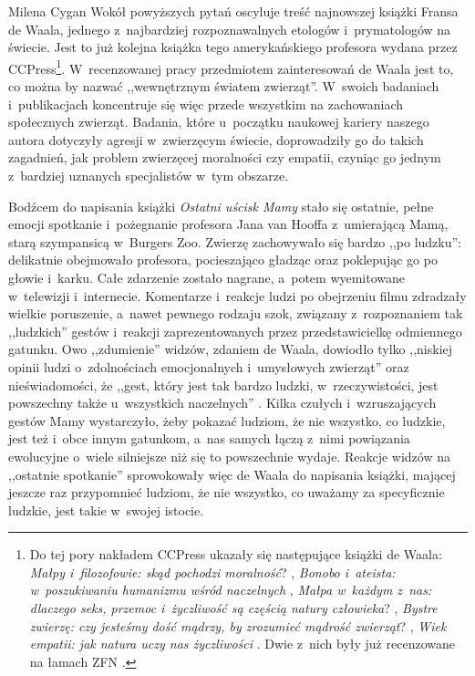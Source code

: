 \begin{newrevplenv}{Milena Cygan}
Wokół powyższych pytań oscyluje treść najnowszej książki Fransa de Waala, jednego z~najbardziej rozpoznawalnych etologów i~prymatologów na świecie. Jest to już kolejna książka tego amerykańskiego profesora wydana przez CCPress\footnote{Do tej pory nakładem CCPress ukazały się następujące książki de Waala: \textit{Małpy i~filozofowie: skąd pochodzi moralność}?
\parencite*[][]{waal_malpy_2013}, %
 \textit{Bonobo i~ateista: w~poszukiwaniu humanizmu wśród naczelnych} 
\parencite*[][]{waal_bonobo_2014}, %
 \textit{Małpa w~każdym z~nas: dlaczego seks, przemoc i~życzliwość są częścią natury człowieka}? 
\parencite*[][]{waal_malpa_2015}, %
 \textit{Bystre zwierzę: czy jesteśmy dość mądrzy, by zrozumieć mądrość zwierząt}? 
\parencite*[][]{waal_bystre_2016}, %
 \textit{Wiek empatii: jak natura uczy nas życzliwości} 
\parencite*[][]{waal_wiek_2019}. %
 Dwie z~nich były już recenzowane na łamach ZFN 
\parencites[][]{sarosiek_odmiennosc_2018}[][]{cygan_empatia_2019}.%
}. W~recenzowanej pracy przedmiotem zainteresowań de Waala jest to, co można by nazwać ,,wewnętrznym światem zwierząt''. W~swoich badaniach i~publikacjach koncentruje się więc przede wszystkim na zachowaniach społecznych zwierząt. Badania, które u~początku naukowej kariery naszego autora dotyczyły agresji w~zwierzęcym świecie, doprowadziły go do takich zagadnień, jak problem zwierzęcej moralności czy empatii, czyniąc go jednym z~bardziej uznanych specjalistów w~tym obszarze.


Bodźcem do napisania książki \textit{Ostatni uścisk Mamy} stało się ostatnie, pełne emocji spotkanie i~pożegnanie profesora Jana van Hooffa z~umierającą Mamą, starą szympansicą w~Burgers Zoo. Zwierzę zachowywało się bardzo ,,po ludzku'': delikatnie obejmowało profesora, pocieszająco gładząc oraz poklepując go po głowie i~karku. Całe zdarzenie zostało nagrane, a~potem wyemitowane w~telewizji i~internecie. Komentarze i~reakcje ludzi po obejrzeniu filmu zdradzały wielkie poruszenie, a~nawet pewnego rodzaju szok, związany z~rozpoznaniem tak ,,ludzkich'' gestów i~reakcji zaprezentowanych przez przedstawicielkę odmiennego gatunku. Owo ,,zdumienie'' widzów, zdaniem de Waala, dowiodło tylko ,,niskiej opinii ludzi o~zdolnościach emocjonalnych i~umysłowych zwierząt''
\parencite[][s.~22]{waal_ostatni_2019} %
 oraz nieświadomości, że ,,gest, który jest tak bardzo ludzki, w~rzeczywistości, jest powszechny także u~wszystkich naczelnych'' 
\parencite[][s.~25]{waal_ostatni_2019}. %
 Kilka czułych i~wzruszających gestów Mamy wystarczyło, żeby pokazać ludziom, że nie wszystko, co ludzkie, jest też i~obce innym gatunkom, a~nas samych łączą z~nimi powiązania ewolucyjne o~wiele silniejsze niż się to powszechnie wydaje. Reakcje widzów na ,,ostatnie spotkanie'' sprowokowały więc de Waala do napisania książki, mającej jeszcze raz przypomnieć ludziom, że nie wszystko, co uważamy za specyficznie ludzkie, jest takie w~swojej istocie.


\end{newrevplenv}
